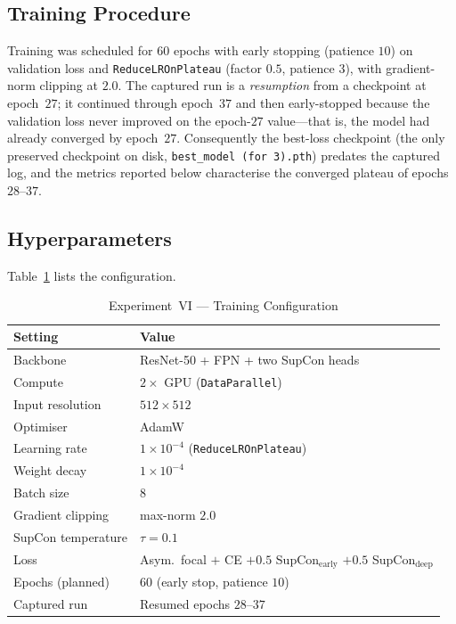\documentclass[journal,twoside,web]{ieeecolor}
\begin{document}
\subsection{Training Procedure}
Training was scheduled for $60$ epochs with early stopping (patience $10$) on
validation loss and \texttt{ReduceLROnPlateau} (factor $0.5$, patience $3$), with
gradient-norm clipping at $2.0$. The captured run is a \emph{resumption} from a
checkpoint at epoch~$27$; it continued through epoch~$37$ and then early-stopped
because the validation loss never improved on the epoch-$27$ value---that is, the
model had already converged by epoch~$27$. Consequently the best-loss checkpoint
(the only preserved checkpoint on disk, \texttt{best\_model (for 3).pth}) predates
the captured log, and the metrics reported below characterise the converged plateau
of epochs $28$--$37$.

\subsection{Hyperparameters}
Table~\ref{tab:exp6_hyper} lists the configuration.

\begin{table}[!t]
\caption{Experiment~VI --- Training Configuration}
\label{tab:exp6_hyper}
\centering
\setlength{\tabcolsep}{5pt}
\begin{tabular}{|l|l|}
\hline
\textbf{Setting} & \textbf{Value} \\
\hline
Backbone & ResNet-50 + FPN + two SupCon heads \\
Compute & $2\times$ GPU (\texttt{DataParallel}) \\
Input resolution & $512\times512$ \\
Optimiser & AdamW \\
Learning rate & $1\times10^{-4}$ (\texttt{ReduceLROnPlateau}) \\
Weight decay & $1\times10^{-4}$ \\
Batch size & $8$ \\
Gradient clipping & max-norm $2.0$ \\
SupCon temperature & $\tau=0.1$ \\
Loss & Asym.\ focal $+$ CE $+ 0.5$ SupCon$_\text{early}$ $+ 0.5$ SupCon$_\text{deep}$ \\
Epochs (planned) & $60$ (early stop, patience $10$) \\
Captured run & Resumed epochs $28$--$37$ \\
\hline
\end{tabular}
\end{table}
\end{document}
